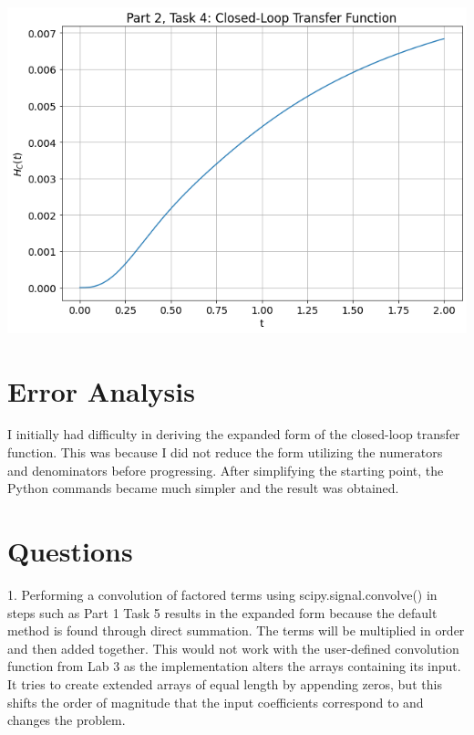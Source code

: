\documentclass[12pt]{report}
\begin{document}
\begin{center}
	\includegraphics[scale = 0.6]{Lab 7 - Plots/Part2-Task4.png}\\[1.0 cm]
\end{center}
	
\section{Error Analysis}

I initially had difficulty in deriving the expanded form of the closed-loop transfer function. This was because I did not reduce the form utilizing the numerators and denominators before progressing. After simplifying the starting point, the Python commands became much simpler and the result was obtained. \\

\section{Questions}

1. Performing a convolution of factored terms using scipy.signal.convolve() in steps such as Part 1 Task 5 results in the expanded form because the default method is found through direct summation. The terms will be multiplied in order and then added together. This would not work with the user-defined convolution function from Lab 3 as the implementation alters the arrays containing its input. It tries to create extended arrays of equal length by appending zeros, but this shifts the order of magnitude that the input coefficients correspond to and changes the problem. \\
\end{document}
